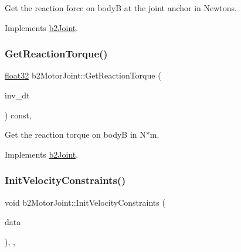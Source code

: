 Get the reaction force on bodyB at the joint anchor in Newtons. 



Implements \mbox{\hyperlink{classb2_joint_a7e0eddefb9b69ad050b8ef6425838a74}{b2\+Joint}}.

\mbox{\label{classb2_motor_joint_a542b68309e0294f8bda152eff92086d9}} 
\subsubsection{\texorpdfstring{GetReactionTorque()}{GetReactionTorque()}}
{\footnotesize\ttfamily \mbox{\hyperlink{b2_settings_8h_aacdc525d6f7bddb3ae95d5c311bd06a1}{float32}} b2\+Motor\+Joint\+::\+Get\+Reaction\+Torque (\begin{DoxyParamCaption}\item[{\mbox{\hyperlink{b2_settings_8h_aacdc525d6f7bddb3ae95d5c311bd06a1}{float32}}}]{inv\+\_\+dt }\end{DoxyParamCaption}) const\hspace{0.3cm}{\ttfamily [override]}, {\ttfamily [virtual]}}



Get the reaction torque on bodyB in N$\ast$m. 



Implements \mbox{\hyperlink{classb2_joint_ae355e441c2aa842777dc04e24f15ced0}{b2\+Joint}}.

\mbox{\label{classb2_motor_joint_aeffac9d1e3940c362962319d1bdb3f22}} 
\subsubsection{\texorpdfstring{InitVelocityConstraints()}{InitVelocityConstraints()}}
{\footnotesize\ttfamily void b2\+Motor\+Joint\+::\+Init\+Velocity\+Constraints (\begin{DoxyParamCaption}\item[{const \mbox{\hyperlink{structb2_solver_data}{b2\+Solver\+Data}} \&}]{data }\end{DoxyParamCaption})\hspace{0.3cm}{\ttfamily [override]}, {\ttfamily [protected]}, {\ttfamily [virtual]}}




